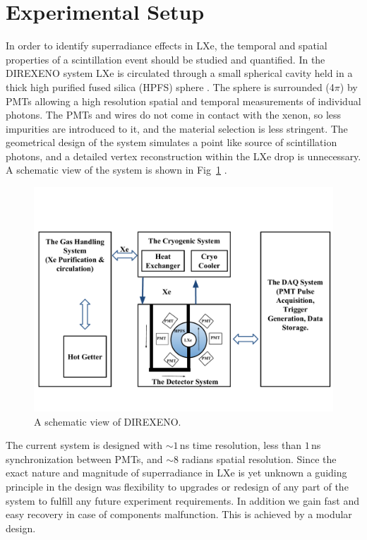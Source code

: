 \section{Experimental Setup}
\label{expSetup}


In order to identify superradiance effects in LXe, the temporal and spatial properties of a scintillation event should be studied and quantified. In the DIREXENO system LXe is circulated through a small spherical cavity held in a thick high purified fused silica (HPFS) sphere . The sphere is surrounded (4$\pi$) by PMTs allowing a high resolution spatial and temporal measurements of individual photons. The PMTs and wires do not come in contact with the xenon, so less impurities are introduced to it, and the material selection is less stringent. The geometrical design of the system simulates a point like source of scintillation photons, and a detailed vertex reconstruction within the LXe drop is unnecessary. A schematic view of the system is shown in Fig~\ref{fig:detSch} . 

\begin{figure}[h]
\centerline{\includegraphics[width=0.8\linewidth]{DetSch.pdf}}
\caption{A schematic view of DIREXENO.}
\label{fig:detSch}
\end{figure}


The current system is designed with  $\sim1$\,ns time resolution, less than $1$\,ns synchronization between PMTs, and $\sim8$ radians spatial resolution. Since the exact nature and magnitude of superradiance in LXe is yet unknown a guiding principle in the design was flexibility to upgrades or redesign of any part of the system to fulfill any future experiment requirements. In addition we gain fast and easy recovery in case of components malfunction. This is achieved by a modular design. 

